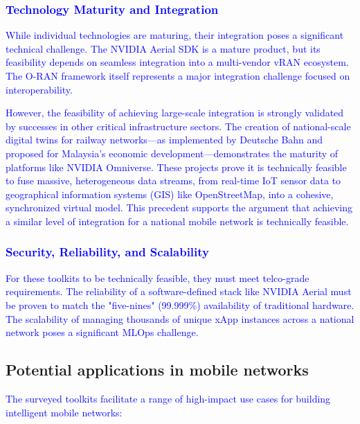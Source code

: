 \documentclass[conference]{IEEEtran}
\begin{document}
\textcolor{blue}{\subsubsection{Technology Maturity and Integration}
While individual technologies are maturing, their integration poses a significant technical challenge. The NVIDIA Aerial SDK is a mature product, but its feasibility depends on seamless integration into a multi-vendor vRAN ecosystem. The O-RAN framework itself represents a major integration challenge focused on interoperability.}

\textcolor{blue}{However, the feasibility of achieving large-scale integration is strongly validated by successes in other critical infrastructure sectors. The creation of national-scale digital twins for railway networks—as implemented by Deutsche Bahn and proposed for Malaysia's economic development—demonstrates the maturity of platforms like NVIDIA Omniverse. These projects prove it is technically feasible to fuse massive, heterogeneous data streams, from real-time IoT sensor data to geographical information systems (GIS) like OpenStreetMap, into a cohesive, synchronized virtual model. This precedent supports the argument that achieving a similar level of integration for a national mobile network is technically feasible.}

\textcolor{blue}{\subsubsection{Security, Reliability, and Scalability}
For these toolkits to be technically feasible, they must meet telco-grade requirements. The reliability of a software-defined stack like NVIDIA Aerial must be proven to match the "five-nines" (99.999\%) availability of traditional hardware. The scalability of managing thousands of unique xApp instances across a national network poses a significant MLOps challenge.}

\subsection{Potential applications in mobile networks}
\textcolor{blue}{The surveyed toolkits facilitate a range of high-impact use cases for building intelligent mobile networks:}
\end{document}
